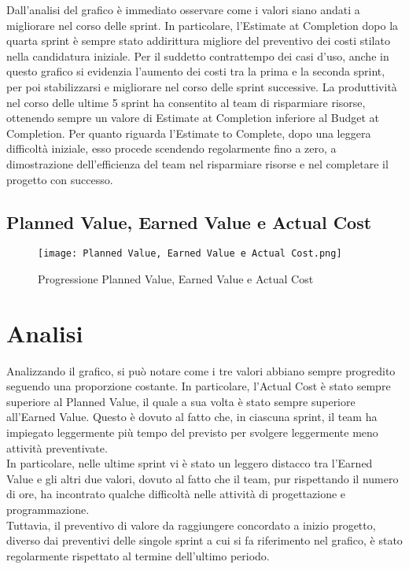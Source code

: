 Dall’analisi del grafico è immediato osservare come i valori siano andati a migliorare
nel corso delle sprint. In particolare, l’Estimate at Completion dopo la quarta sprint
è sempre stato addirittura migliore del preventivo dei costi stilato nella candidatura iniziale. Per il suddetto
contrattempo dei casi d'uso, anche in questo grafico si evidenzia l'aumento dei costi tra la prima
e la seconda sprint, per poi stabilizzarsi e migliorare nel corso delle sprint successive. La produttività nel corso delle ultime 5 sprint ha consentito al team di risparmiare risorse, ottenendo sempre un valore di Estimate at Completion inferiore al Budget at Completion. Per quanto riguarda l'Estimate to Complete, dopo una leggera difficoltà iniziale, esso procede scendendo regolarmente fino a zero, a dimostrazione dell'efficienza del team nel risparmiare risorse e nel completare il progetto con successo.

\newpage

\subsection{Planned Value, Earned Value e Actual Cost}
\label{subsec:Planned Value, Earned Value e Actual Cost}

\begin{figure}[h] 
    \centering
    \texttt{[image: Planned Value, Earned Value e Actual Cost.png]}
    \caption{Progressione Planned Value, Earned Value e Actual Cost} 
    \label{fig: Planned Value, Earned Value e Actual Cost}
\end{figure}

\section*{Analisi}

Analizzando il grafico, si può notare come i tre valori abbiano sempre progredito seguendo una
proporzione costante. In particolare, l’Actual Cost è stato sempre superiore al Planned Value,
il quale a sua volta è stato sempre superiore all’Earned Value. Questo è dovuto al fatto che, in ciascuna sprint,
il team ha impiegato leggermente più tempo del previsto per svolgere leggermente meno attività preventivate.\\
In particolare, nelle ultime sprint vi è stato un leggero distacco tra l'Earned Value e gli altri due valori, dovuto al fatto che il team, pur rispettando il numero di ore, ha incontrato qualche difficoltà nelle attività di progettazione e programmazione.\\
Tuttavia, il preventivo di valore da raggiungere concordato a inizio progetto, diverso dai preventivi delle singole sprint a cui si fa riferimento nel grafico, è stato regolarmente rispettato al termine dell'ultimo periodo.


